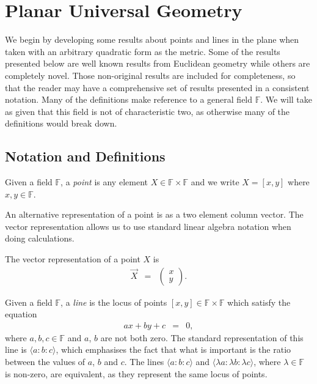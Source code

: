 \chapter{Planar Universal Geometry}\label{chap:metric}

We begin by developing some results about points and lines in the plane when taken with an arbitrary quadratic form as the metric.
Some of the results presented below are well known results from Euclidean geometry while others are completely novel.
Those non-original results are included for completeness, so that the reader may have a comprehensive set of results presented in a consistent notation.
Many of the definitions make reference to a general field $\mathbb{F}$.
We will take as given that this field is not of characteristic two, as otherwise many of the definitions would break down.

\section{Notation and Definitions}

\begin{definition} Given a field $\mathbb{F}$, a \emph{point} is any element $X \in \mathbb{F}\times\mathbb{F}$ and we write $X = [x, y]$ where $x, y \in \mathbb{F}$.
\end{definition}
An alternative representation of a point is as a two element column vector.
The vector representation allows us to use standard linear algebra notation when doing calculations.
\begin{definition} The vector representation of a point $X$ is
\begin{eqnarray}
\vec{X} & = & \begin{pmatrix} x \\ y \end{pmatrix}.
\end{eqnarray}
\end{definition}

\begin{definition} Given a field $\mathbb{F}$, a \emph{line} is the locus of points $[x, y] \in \mathbb{F}\times\mathbb{F}$ which satisfy the equation
\begin{eqnarray}
ax + by + c & = & 0,
\end{eqnarray}
where $a, b, c \in \mathbb{F}$ and $a$, $b$ are not both zero.
The standard representation of this line is $\langle a\!:\!b\!:\!c \rangle$, which emphasises the fact that what is important is the ratio between the values of $a$, $b$ and $c$.
The lines $\langle a\!:\!b\!:\!c \rangle$ and $\langle \lambda a\!:\! \lambda b\!:\! \lambda c \rangle$, where $\lambda \in \mathbb{F}$ is non-zero, are equivalent, as they represent the same locus of points.
\end{definition}

